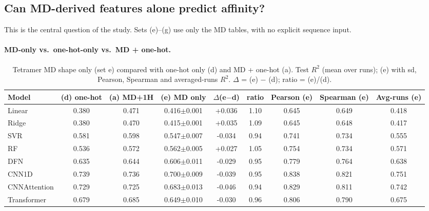 \subsection{Can MD-derived features alone predict affinity?}\label{sec:mdaim}
This is the central question of the study. Sets (e)--(g) use only the MD tables, with no explicit sequence input.

\paragraph{MD-only vs.\ one-hot-only vs.\ MD + one-hot.}
\begin{table}[H]\centering\scriptsize\setlength{\tabcolsep}{3pt}
\caption{Tetramer MD shape only (set e) compared with one-hot only (d) and MD + one-hot (a). Test $R^2$ (mean over runs); (e) with sd, Pearson, Spearman and averaged-runs $R^2$. $\Delta$ = (e) $-$ (d); ratio = (e)/(d).}
\begin{tabular}{lcccccccc}\toprule
Model & (d) one-hot & (a) MD+1H & (e) MD only & $\Delta$(e$-$d) & ratio & Pearson (e) & Spearman (e) & Avg-runs (e)\\\midrule
Linear & 0.380 & 0.471 & 0.416$\pm$0.001 & +0.036 & 1.10 & 0.645 & 0.649 & 0.418 \\
Ridge & 0.380 & 0.470 & 0.415$\pm$0.001 & +0.035 & 1.09 & 0.645 & 0.648 & 0.417 \\
SVR & 0.581 & 0.598 & 0.547$\pm$0.007 & -0.034 & 0.94 & 0.741 & 0.734 & 0.555 \\
RF & 0.536 & 0.572 & 0.562$\pm$0.005 & +0.027 & 1.05 & 0.754 & 0.734 & 0.571 \\
DFN & 0.635 & 0.644 & 0.606$\pm$0.011 & -0.029 & 0.95 & 0.779 & 0.764 & 0.638 \\
CNN1D & 0.739 & 0.736 & 0.700$\pm$0.009 & -0.039 & 0.95 & 0.838 & 0.821 & 0.751 \\
CNNAttention & 0.729 & 0.725 & 0.683$\pm$0.013 & -0.046 & 0.94 & 0.829 & 0.811 & 0.742 \\
Transformer & 0.679 & 0.685 & 0.649$\pm$0.010 & -0.030 & 0.96 & 0.806 & 0.790 & 0.675 \\
\bottomrule\end{tabular}\label{tab:mdverdict}\end{table}
